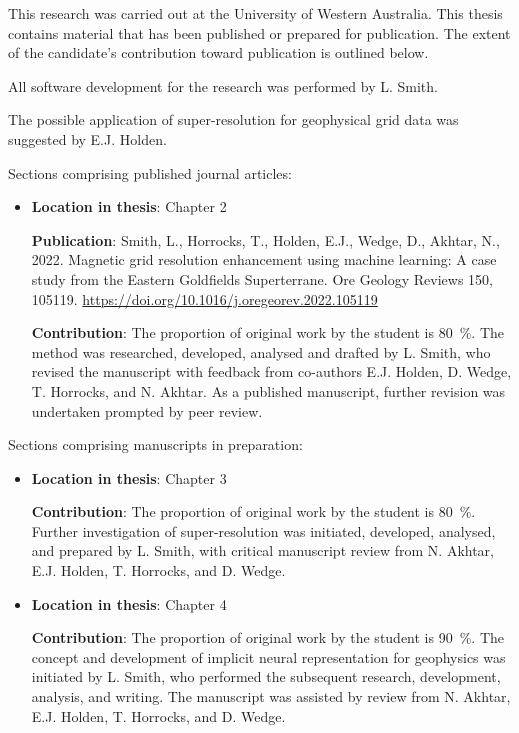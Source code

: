 % 

This research was carried out at the University of Western Australia.
This thesis contains material that has been published or prepared for publication.
The extent of the candidate's contribution toward publication is outlined below.

\smallskip{}
\noindent{}All software development for the research was performed by L. Smith.

\noindent{}The possible application of super-resolution for geophysical grid data was suggested by E.J. Holden.

\medskip{}
\noindent{}Sections comprising published journal articles:
\begin{itemize}
      \item{}\textbf{Location in thesis}: Chapter 2

            \textbf{Publication}: Smith, L., Horrocks, T., Holden, E.J., Wedge, D., Akhtar, N., 2022. Magnetic grid resolution enhancement using machine learning: A case study from the Eastern Goldfields Superterrane. Ore Geology Reviews 150, 105119.
            \url{https://doi.org/10.1016/j.oregeorev.2022.105119}
            
            \textbf{Contribution}: The proportion of original work by the student is \qty{80}{\percent}.
            The method was researched, developed, analysed and drafted by L. Smith, who revised the manuscript with feedback from co-authors E.J. Holden, D. Wedge, T. Horrocks, and N. Akhtar.
            As a published manuscript, further revision was undertaken prompted by peer review.
\end{itemize}

\noindent{}Sections comprising manuscripts in preparation:
\begin{itemize}
      \item{}
            \textbf{Location in thesis}: Chapter 3

            \textbf{Contribution}: The proportion of original work by the student is \qty{80}{\percent}.
            Further investigation of super-resolution was initiated, developed, analysed, and prepared by L. Smith, with critical manuscript review from N. Akhtar, E.J. Holden, T. Horrocks, and D. Wedge.

      \item{}
            \textbf{Location in thesis}: Chapter 4

            \textbf{Contribution}: The proportion of original work by the student is \qty{90}{\percent}.
            The concept and development of implicit neural representation for geophysics was initiated by L. Smith, who performed the subsequent research, development, analysis, and writing. The manuscript was assisted by review from N. Akhtar, E.J. Holden, T. Horrocks, and D. Wedge.

\end{itemize}

